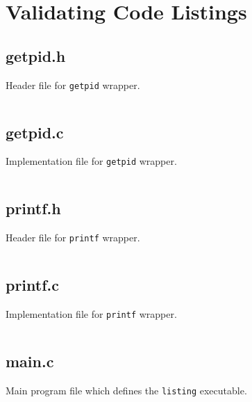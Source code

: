 \section{Validating \af Code Listings}\label{sec:linkage}

\subsection{getpid.h}
\begin{listing}[H] %
  \caption{Header file for \texttt{getpid} wrapper.}
    \label{lst:getpid-h}
    \inputminted[fontsize=\small, frame=single, linenos]{c}{./listings/linkage/getpid.h}
\end{listing}

\subsection{getpid.c}
\begin{listing}[H]
  \caption{Implementation file for \texttt{getpid} wrapper.}
    \label{lst:getpid-c}
    \inputminted[fontsize=\small, frame=single, linenos]{c}{./listings/linkage/getpid.c}
\end{listing}

\subsection{printf.h}
\begin{listing}[H]
  \caption{Header file for \texttt{printf} wrapper.}
    \label{lst:printf-h}
    \inputminted[fontsize=\small, frame=single, linenos]{c}{./listings/linkage/printf.h}
\end{listing}

\subsection{printf.c}
\begin{listing}[H]
  \caption{Implementation file for \texttt{printf} wrapper.}
    \label{lst:printf-c}
    \inputminted[fontsize=\small, frame=single, linenos]{c}{./listings/linkage/printf.c}
\end{listing}

\subsection{main.c}
\begin{listing}[H]
  \caption{Main program file which defines the \texttt{listing} executable.}
    \label{lst:main_c} %
    \inputminted[fontsize=\small, frame=single, linenos]{c}{./listings/linkage/main.c}
\end{listing}

